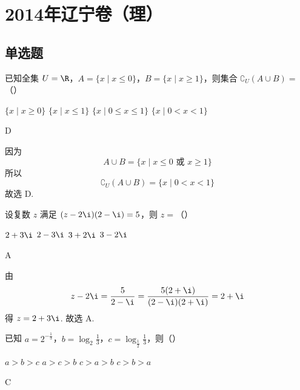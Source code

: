 \chapter{2014年辽宁卷（理）}

\section{单选题}

\begin{problem}
已知全集 \(U = \R\)，\(A = \{x \mid x \leqslant 0\}\)，\(B = \{x \mid x \geqslant 1\}\)，则集合 \(\complement_U (A \cup B) =\)（\quad）

\choices
    {\( \{x \mid x \geqslant 0\} \)}
    {\(\{x\mid x\leqslant 1\}\)}
    {\(\{x\mid 0\leqslant x\leqslant 1\}\)}
    {\(\{x\mid 0 < x < 1\}\)}
\end{problem}

\begin{answer}
D
\end{answer}

\begin{solution}
因为
\[
A\cup B=\{x\mid x\leqslant0\text{ 或 }x\geqslant1\}
\]
所以
\[
\complement_U(A\cup B)=\{x\mid 0<x<1\}
\]
故选 D.
\end{solution}

\begin{problem}
设复数 \(z\) 满足 \((z - 2\i)(2 - \i) = 5\)，则 \(z =\)（\quad）

\choices
    {\(2 + 3\i\)}
    {\(2 - 3\i\)}
    {\(3 + 2\i\)}
    {\(3 - 2\i\)}
\end{problem}

\begin{answer}
A
\end{answer}

\begin{solution}
由
\[
z-2\i=\frac{5}{2-\i}=\frac{5(2+\i)}{(2-\i)(2+\i)}=2+\i
\]
得 \(z=2+3\i\). 故选 A.
\end{solution}

\begin{problem}
已知 \(a = 2^{-\frac{1}{3}}\)，\(b = \log_{2} \frac{1}{3}\)，\(c = \log_{\frac{1}{2}} \frac{1}{3}\)，则（\quad）

\choices
    {\(a > b > c\)}
    {\(a > c > b\)}
    {\(c > a > b\)}
    {\(c > b > a\)}
\end{problem}

\begin{answer}
C
\end{answer}

